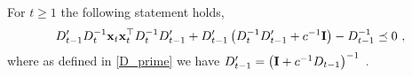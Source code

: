 \begin{lemma}
For $t \geq 1$ the following statement holds,
\begin{align*}
D'_{t-1}D_{t}^{-1}\mathbf{x}_{t}{\mathbf{x}}^{\top}_{t}D_{t}^{-1}D'_{t-1}
+D'_{t-1}\left(D_{t}^{-1}D'_{t-1}+c^{-1}\mathbf{I}\right)-D_{t-1}^{-1}
\preceq0~,
\end{align*}
where as defined in \eqref{D_prime} we have
\(
D'_{t-1}=\left(\mathbf{I}+c^{-1}D_{t-1}\right)^{-1}~.
\)
\label{lem:technical}
\end{lemma}
